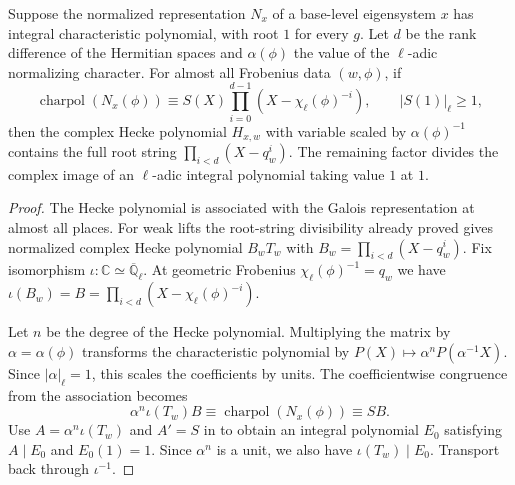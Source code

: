 \begin{lemma}
\label{lem:c-hecke-local-root-chain}
\emitthmsource
Suppose the normalized representation $N_x$ of a base-level eigensystem $x$ has integral characteristic polynomial, with root $1$ for every $g$. Let $d$ be the rank difference of the Hermitian spaces and $\alpha(\phi)$ the value of the $\ell$-adic normalizing character. For almost all Frobenius data $(w,\phi)$, if
\[
 \operatorname{charpol}(N_x(\phi))\equiv S(X)\prod_{i=0}^{d-1}(X-\chi_\ell(\phi)^{-i}),
 \qquad |S(1)|_\ell\ge1 ,
\]
then the complex Hecke polynomial $H_{x,w}$ with variable scaled by $\alpha(\phi)^{-1}$ contains the full root string $\prod_{i<d}(X-q_w^i)$. The remaining factor divides the complex image of an $\ell$-adic integral polynomial taking value $1$ at $1$.
\end{lemma}
\begin{proof}
The Hecke polynomial is associated with the Galois representation at almost all places. For weak lifts the root-string divisibility already proved gives normalized complex Hecke polynomial $B_w T_w$ with $B_w=\prod_{i<d}(X-q_w^i)$. Fix isomorphism $\iota\colon\mathbb C\simeq\overline{\mathbb Q}_\ell$. At geometric Frobenius $\chi_\ell(\phi)^{-1}=q_w$ we have $\iota(B_w)=B=\prod_{i<d}(X-\chi_\ell(\phi)^{-i})$.

Let $n$ be the degree of the Hecke polynomial. Multiplying the matrix by $\alpha=\alpha(\phi)$ transforms the characteristic polynomial by $P(X)\mapsto\alpha^n P(\alpha^{-1}X)$. Since $|\alpha|_\ell=1$, this scales the coefficients by units. The coefficientwise congruence from the association becomes
\[
 \alpha^n\iota(T_w)B\equiv\operatorname{charpol}(N_x(\phi))\equiv S B .
\]
Use $A=\alpha^n\iota(T_w)$ and $A'=S$ in  to obtain an integral polynomial $E_0$ satisfying $A\mid E_0$ and $E_0(1)=1$. Since $\alpha^n$ is a unit, we also have $\iota(T_w)\mid E_0$. Transport back through $\iota^{-1}$.
\end{proof}

